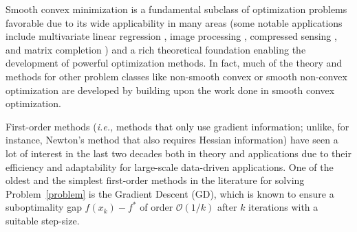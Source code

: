 \documentclass{article}
\theoremstyle{plain}
\theoremstyle{definition}
\theoremstyle{remark}
\newcommand{\aynote}[1]{\textcolor{red}{[\textbf{Note:} #1]}}
\begin{document}
Smooth convex minimization is a fundamental subclass of optimization problems favorable due to its wide applicability in many areas (some notable applications include multivariate linear regression \citep{lu2012convex}, image processing \citep{iPiasco}, compressed sensing \citep{bobin2009fast}, and matrix completion \citep{zhang2011strongly}) and a rich theoretical foundation enabling the development of powerful optimization methods. In fact, much of the theory and methods for other problem classes like non-smooth convex or smooth non-convex optimization are developed by building upon the work done in smooth convex optimization.

First-order methods (\emph{i.e.,} methods that only use gradient information; unlike, for instance, Newton’s method that also requires Hessian information) have seen a lot of interest in the last two decades both in theory and applications due to their efficiency and adaptability for large-scale data-driven applications. One of the oldest and the simplest first-order methods in the literature for solving Problem~\eqref{problem} is the Gradient Descent (GD), which is known to ensure a suboptimality gap $f(x_k) - f^*$ of order $\mathcal{O}(1/k)$ after $k$ iterations with a suitable step-size.

\end{document}
